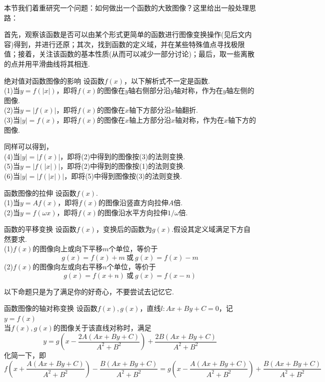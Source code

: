\documentclass[lang=cn, zihao=5]{elegantbook}
\begin{document}
本节我们着重研究一个问题：如何做出一个函数的大致图像？这里给出一般处理思路：

首先，观察该函数是否可以由某个形式更简单的函数进行图像变换操作(见后文内容)得到，并进行还原；其次，找到函数的定义域，并在某些特殊值点寻找极限值；接着，关注该函数的基本性质(从而可以减少一部分讨论)；最后，取一些离散的点并用平滑曲线将其相连.

\begin{proposition}{绝对值对函数图像的影响}
    设函数$f(x)$，以下解析式不一定是函数.\\
    (1)当$y=f(|x|)$，即将$f(x)$的图像在$y$轴右侧部分沿$y$轴对称，作为在$y$轴左侧的图像.\\
    (2)当$y=|f(x)|$，即将$f(x)$的图像在$x$轴下方部分沿$x$轴翻折.\\
    (3)当$|y|=f(x)$，即将$f(x)$的图像在$x$轴上方部分沿$x$轴对称，作为在$x$轴下方的图像.
\end{proposition}

\begin{remark}
	同样可以得到，\\ 
    (4)当$|y|=|f(x)|$，即将(2)中得到的图像按(3)的法则变换.\\
    (5)当$y=|f(|x|)|$，即将(2)中得到的图像按(1)的法则变换.\\
    (6)当$|y|=|f(|x|)|$，即将(5)中得到图像按(3)的法则变换.
\end{remark}

\begin{proposition}{函数图像的拉伸}
    设函数$f(x)$.\\
    (1)当$y=Af(x)$，即将$f(x)$的图像沿竖直方向拉伸$A$倍.\\
    (2)当$y=f(\omega x)$，即将$f(x)$的图像沿水平方向拉伸$1/\omega$倍.
\end{proposition}

\begin{proposition}{函数的平移变换}
    设函数$f(x)$，变换后的函数为$g(x)$.假设其定义域满足下方自然要求.\\
    (1)$f(x)$的图像向上或向下平移$m$个单位，等价于$$g(x)=f(x)+m \ \text{或} \ g(x)=f(x)-m$$
    (2)$f(x)$的图像向左或向右平移$n$个单位，等价于$$g(x)=f(x+n) \ \text{或} \ g(x)=f(x-n)$$
\end{proposition}

以下命题只是为了满足你的好奇心，不要尝试去记忆它.

\begin{proposition}{函数图像的轴对称变换}
    设函数$f(x),g(x)$，直线$l:Ax+By+C=0$，记$y=f(x)$\\
    当$f(x),g(x)$的图像关于该直线对称时，满足$$y = g\left(  x - \frac{2A(Ax+By+C)}{A^2+B^2}  \right) + \frac{2B(Ax+By+C)}{A^2+B^2}$$
    化简一下，即\small$$f \left(  x + \frac{A(Ax+By+C)}{A^2+B^2}  \right) - \frac{B(Ax+By+C)}{A^2+B^2} = g \left(  x - \frac{A(Ax+By+C)}{A^2+B^2}  \right) + \frac{B(Ax+By+C)}{A^2+B^2}$$\normalsize
\end{proposition}
\end{document}
